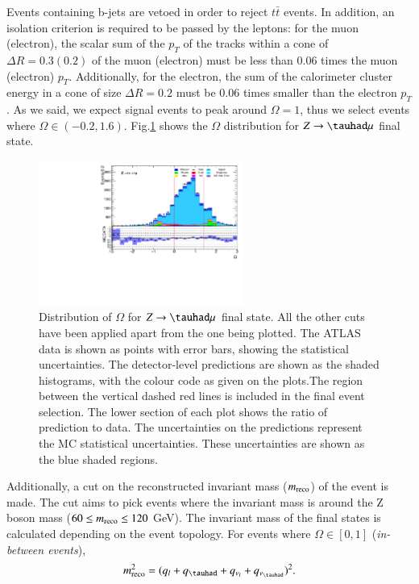 Events containing b-jets are vetoed in order to reject $t\bar{t}$ events. In addition, an isolation criterion is required to be passed by the leptons: for the muon (electron), the scalar sum of the $p_T$ of the tracks within a cone of $\Delta R=0.3 (0.2)$ of the muon (electron) must be less than 0.06 times the muon (electron) $p_T$. Additionally, for the electron, the sum of the calorimeter cluster energy in a cone of size $\Delta R=0.2$ must be 0.06 times smaller than the electron $p_T$. As we said, we expect signal events to peak around $\Omega=1$, thus we select events where $\Omega\in (-0.2,1.6)$. Fig.\ref{Fig3} shows the $\Omega$ distribution for $Z\to\tauhad\mu$ final state.
\begin{figure}[htbp]
	\centering
	\includegraphics[width=0.6\textwidth]{figures/Fig3.pdf}
	\caption{Distribution of $\Omega$ for $Z\to\tauhad\mu$ final state. All the other cuts have been applied apart from the one being plotted. The ATLAS data is shown as points with error bars, showing the statistical uncertainties. The detector-level predictions are shown as the shaded histograms, with the colour code as given on the plots.The region between the vertical dashed red lines is included in the final event selection. The lower section of each plot shows the ratio of prediction to data. The uncertainties on the predictions represent the MC statistical uncertainties. These uncertainties are shown as the blue shaded regions.}
	\label{Fig3}
\end{figure}
Additionally, a cut on the reconstructed invariant mass ($m_{\text{reco}}$) of the event is made. The cut aims to pick events where the invariant mass is around the Z boson mass ($60\leq m_{\text{reco}}\leq 120$ GeV). The invariant mass of the final states is calculated depending on the event topology. For events where $\Omega\in [0,1]$ (\textit{in-between events}),
\begin{equation}
\mreco^{2}=(q_l+q_{\tauhad}+q_{\nu_l}+q_{\nu_{\tauhad}})^2.
\label{eq35}
\end{equation}
